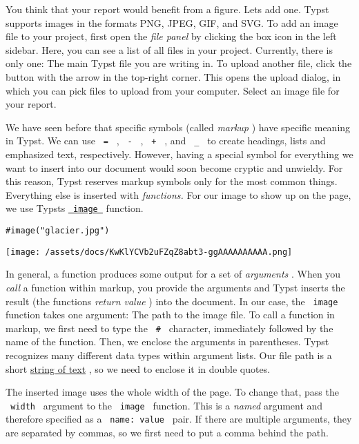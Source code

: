 You think that your report would benefit from a figure.
Let\textquotesingle s add one. Typst supports images in the formats PNG,
JPEG, GIF, and SVG. To add an image file to your project, first open the
\emph{file panel} by clicking the box icon in the left sidebar. Here,
you can see a list of all files in your project. Currently, there is
only one: The main Typst file you are writing in. To upload another
file, click the button with the arrow in the top-right corner. This
opens the upload dialog, in which you can pick files to upload from your
computer. Select an image file for your report.


We have seen before that specific symbols (called \emph{markup} ) have
specific meaning in Typst. We can use \texttt{\ =\ } , \texttt{\ -\ } ,
\texttt{\ +\ } , and \texttt{\ \_\ } to create headings, lists and
emphasized text, respectively. However, having a special symbol for
everything we want to insert into our document would soon become cryptic
and unwieldy. For this reason, Typst reserves markup symbols only for
the most common things. Everything else is inserted with
\emph{functions.} For our image to show up on the page, we use
Typst\textquotesingle s
\href{/docs/reference/visualize/image/}{\texttt{\ image\ }} function.

\begin{verbatim}
#image("glacier.jpg")
\end{verbatim}

\texttt{[image: /assets/docs/KwKlYCVb2uFZqZ8abt3-ggAAAAAAAAAA.png]}

In general, a function produces some output for a set of
\emph{arguments} . When you \emph{call} a function within markup, you
provide the arguments and Typst inserts the result (the
function\textquotesingle s \emph{return value} ) into the document. In
our case, the \texttt{\ image\ } function takes one argument: The path
to the image file. To call a function in markup, we first need to type
the \texttt{\ \#\ } character, immediately followed by the name of the
function. Then, we enclose the arguments in parentheses. Typst
recognizes many different data types within argument lists. Our file
path is a short \href{/docs/reference/foundations/str/}{string of text}
, so we need to enclose it in double quotes.

The inserted image uses the whole width of the page. To change that,
pass the \texttt{\ width\ } argument to the \texttt{\ image\ } function.
This is a \emph{named} argument and therefore specified as a
\texttt{\ name:\ value\ } pair. If there are multiple arguments, they
are separated by commas, so we first need to put a comma behind the
path.

